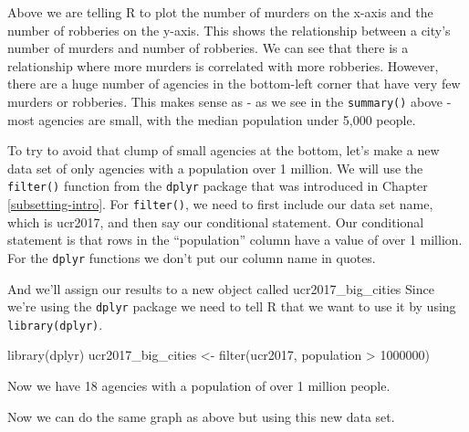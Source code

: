 \documentclass[
]{krantz}
\makeatletter
\newenvironment{Shaded}{\begin{snugshade}}{\end{snugshade}}
\newcommand{\DecValTok}[1]{\textcolor[rgb]{0.06,0.06,0.06}{#1}}
\newcommand{\FunctionTok}[1]{\textcolor[rgb]{0,0,0}{#1}}
\newcommand{\NormalTok}[1]{#1}
\newcommand{\OtherTok}[1]{\textcolor[rgb]{0.37,0.37,0.37}{#1}}
\newcommand{\SpecialCharTok}[1]{\textcolor[rgb]{0,0,0}{#1}}
\newenvironment{kframe}{%
\medskip{}
\setlength{\fboxsep}{.8em}
 \def\at@end@of@kframe{}%
 \ifinner\ifhmode%
  \def\at@end@of@kframe{\end{minipage}}%
  \begin{minipage}{\columnwidth}%
 \fi\fi%
 \def\FrameCommand##1{\hskip\@totalleftmargin \hskip-\fboxsep
 \colorbox{shadecolor}{##1}\hskip-\fboxsep
     \hskip-\linewidth \hskip-\@totalleftmargin \hskip\columnwidth}%
 \MakeFramed {\advance\hsize-\width
   \@totalleftmargin\z@ \linewidth\hsize
   \@setminipage}}%
 {\par\unskip\endMakeFramed%
 \at@end@of@kframe}
\renewenvironment{Shaded}{\begin{kframe}}{\end{kframe}}
\makeatother
\begin{document}
Above we are telling R to plot the number of murders on the
x-axis and the number of robberies on the y-axis. This shows
the relationship between a city's number of murders and
number of robberies. We can see that there is a relationship
where more murders is correlated with more robberies.
However, there are a huge number of agencies in the
bottom-left corner that have very few murders or robberies.
This makes sense as - as we see in the \texttt{summary()}
above - most agencies are small, with the median population
under 5,000 people.

To try to avoid that clump of small agencies at the bottom,
let's make a new data set of only agencies with a population
over 1 million. We will use the \texttt{filter()} function
from the \texttt{dplyr} package that was introduced in
Chapter \ref{subsetting-intro}. For \texttt{filter()}, we
need to first include our data set name, which is ucr2017,
and then say our conditional statement. Our conditional
statement is that rows in the ``population'' column have a
value of over 1 million. For the \texttt{dplyr} functions we
don't put our column name in quotes.

And we'll assign our results to a new object called
ucr2017\_big\_cities Since we're using the \texttt{dplyr}
package we need to tell R that we want to use it by using
\texttt{library(dplyr)}.

\begin{Shaded}
\begin{Highlighting}[]
\FunctionTok{library}\NormalTok{(dplyr)}
\NormalTok{ucr2017\_big\_cities }\OtherTok{\textless{}{-}} \FunctionTok{filter}\NormalTok{(ucr2017, population }\SpecialCharTok{\textgreater{}} \DecValTok{1000000}\NormalTok{)}
\end{Highlighting}
\end{Shaded}

Now we have 18 agencies with a population of over 1 million
people.

Now we can do the same graph as above but using this new
data set.

\begin{Shaded}
\end{Shaded}
\end{document}
